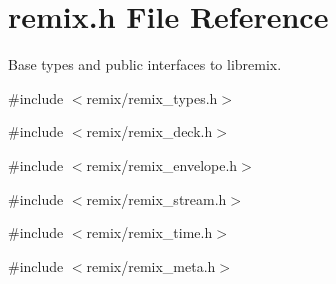 \section{remix.h File Reference}
\label{remix_8h}


Base types and public interfaces to libremix.  


{\ttfamily \#include $<$remix/remix\_\-types.h$>$}\par
{\ttfamily \#include $<$remix/remix\_\-deck.h$>$}\par
{\ttfamily \#include $<$remix/remix\_\-envelope.h$>$}\par
{\ttfamily \#include $<$remix/remix\_\-stream.h$>$}\par
{\ttfamily \#include $<$remix/remix\_\-time.h$>$}\par
{\ttfamily \#include $<$remix/remix\_\-meta.h$>$}\par
